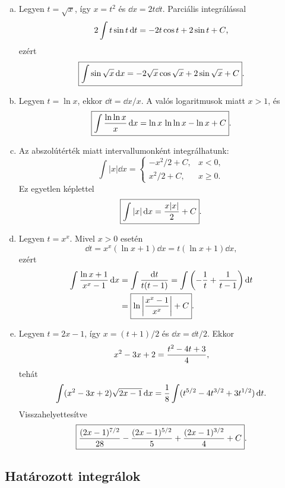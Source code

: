 \documentclass{szb-solution}
\begin{document}
\begin{enumerate}[a)]
  \item Legyen $t=\sqrt x$, így $x=t^2$ és $\dd x=2t\dd t$. Parciális
        integrálással
        $$
          2\int t\sin t\mathop{}\!\mathrm{d} t=-2t\cos t+2\sin t+C
          \text,
        $$
        ezért
        $$
          \boxed{\int\sin\sqrt x\mathop{}\!\mathrm{d} x
          =-2\sqrt x\cos\sqrt x+2\sin\sqrt x+C}
          \text.
        $$

  \item Legyen $t=\ln x$, ekkor $\dd t=\dd x/x$. A valós logaritmusok miatt
        $x>1$, és
        $$
          \boxed{\int\frac{\ln\ln x}{x}\mathop{}\!\mathrm{d} x
          =\ln x\,\ln\ln x-\ln x+C}
          \text.
        $$

  \item Az abszolútérték miatt intervallumonként integrálhatunk:
        $$
          \int|x|\dd x=
          \begin{cases}
            -x^2/2+C,&x<0,\\
            x^2/2+C,&x\geq0.
          \end{cases}
        $$
        Ez egyetlen képlettel
        $$
          \boxed{\int|x|\mathop{}\!\mathrm{d} x=\frac{x|x|}{2}+C}
          \text.
        $$

  \item Legyen $t=x^x$. Mivel $x>0$ esetén
        $$
          \dd t=x^x(\ln x+1)\dd x=t(\ln x+1)\dd x,
        $$
        ezért
        \begin{align*}
          \int\frac{\ln x+1}{x^x-1}\mathop{}\!\mathrm{d} x
          &=\int\frac{\mathop{}\!\mathrm{d} t}{t(t-1)}
            =\int\left(-\frac1t+\frac1{t-1}\right)\mathop{}\!\mathrm{d} t\\
          &=\boxed{\ln\left|\frac{x^x-1}{x^x}\right|+C}
          \text.
        \end{align*}

  \item Legyen $t=2x-1$, így $x=(t+1)/2$ és $\dd x=\dd t/2$. Ekkor
        $$
          x^2-3x+2=\frac{t^2-4t+3}{4}
          \text,
        $$
        tehát
        $$
          \int(x^2-3x+2)\sqrt{2x-1}\mathop{}\!\mathrm{d} x
          =\frac18\int(t^{5/2}-4t^{3/2}+3t^{1/2})\mathop{}\!\mathrm{d} t
          \text.
        $$
        Visszahelyettesítve
        $$
          \boxed{\frac{(2x-1)^{7/2}}{28}
          -\frac{(2x-1)^{5/2}}5
          +\frac{(2x-1)^{3/2}}4+C}
          \text.
        $$
\end{enumerate}

\subsection{Határozott integrálok}
\end{document}

